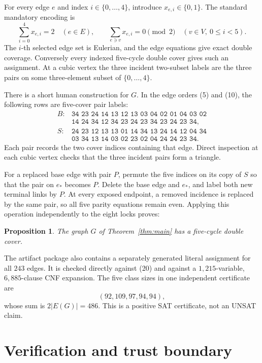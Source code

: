 \documentclass[11pt]{article}
\newtheorem{proposition}[theorem]{Proposition}
\theoremstyle{definition}
\theoremstyle{remark}
\begin{document}
For every edge \(e\) and index \(i\in\{0,\ldots,4\}\), introduce
\(x_{e,i}\in\{0,1\}\).  The standard mandatory encoding is
\[
 \sum_{i=0}^4x_{e,i}=2\quad(e\in E),\qquad
 \sum_{e\ni v}x_{e,i}=0\pmod2\quad(v\in V,\ 0\le i<5).    \tag{20}
\]
The \(i\)-th selected edge set is Eulerian, and the edge equations give
exact double coverage.  Conversely every indexed five-cycle double
cover gives such an assignment.  At a cubic vertex the three incident
two-subset labels are the three pairs on some three-element subset of
\(\{0,\ldots,4\}\).

There is a short human construction for \(G\).  In the edge orders
(5) and (10), the following rows are five-cover pair labels:
\[
\begin{array}{ll}
B:&
\texttt{34 23 24 14 13 12 13 03 04 02 01 04 03 02}\\
 &\texttt{14 24 34 12 34 23 24 23 34 23 24 23 34},\\[1mm]
S:&
\texttt{24 23 12 13 13 01 14 34 13 24 14 12 04 34}\\
 &\texttt{03 34 13 14 03 02 23 02 04 24 24 23 34}.
\end{array}                                                \tag{21}
\]
Each pair records the two cover indices containing that edge.  Direct
inspection at each cubic vertex checks that the three incident pairs
form a triangle.

For a replaced base edge with pair \(P\), permute the five indices on
its copy of \(S\) so that the pair on \(e_*\) becomes \(P\).  Delete
the base edge and \(e_*\), and label both new terminal links by \(P\).
At every exposed endpoint, a removed incidence is replaced by the same
pair, so all five parity equations remain even.  Applying this operation
independently to the eight locks proves:

\begin{proposition}\label{prop:positive}
The graph \(G\) of Theorem~\ref{thm:main} has a five-cycle double cover.
\end{proposition}

The artifact package also contains a separately generated literal
assignment for all \(243\) edges.  It is checked directly against (20)
and against a \(1{,}215\)-variable, \(6{,}885\)-clause CNF expansion.
The five class sizes in one independent certificate are
\[
                         (92,109,97,94,94),                \tag{22}
\]
whose sum is \(2|E(G)|=486\).  This is a positive SAT certificate, not
an UNSAT claim.

\section{Verification and trust boundary}
\end{document}
